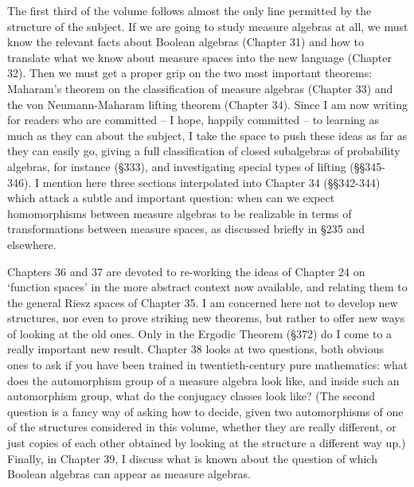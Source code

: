 The first third of the volume follows almost the only line permitted by
the structure of the subject.   If we are going to study measure
algebras at all, we must know the relevant facts about Boolean algebras
(Chapter 31) and how to translate what we know about measure spaces into
the new language (Chapter 32).   Then we must get a proper grip on the
two most important theorems:  Maharam's theorem on the classification of
measure algebras (Chapter 33) and the von Neumann-Maharam lifting
theorem (Chapter 34).   Since I am now writing for readers who are
committed -- I hope, happily committed -- to learning as much as they
can about the subject, I take the space to push these ideas as far as
they can easily go, giving a full classification of closed subalgebras
of probability algebras, for instance (\S333), and investigating special
types of lifting (\S\S345-346).   I mention here three sections
interpolated into Chapter 34 (\S\S342-344) which attack a subtle and
important question:  when can we expect homomorphisms between measure
algebras to be realizable in terms of transformations between measure
spaces, as discussed briefly in \S235 and elsewhere.
     
Chapters 36 and 37 are devoted to re-working the ideas of Chapter 24 on
`function spaces' in the more abstract context now available, and
relating them to the general Riesz spaces of Chapter 35.   I am
concerned here not to develop new structures, nor even to prove striking
new theorems, but rather to offer new ways of looking at the old ones.
Only in the Ergodic Theorem (\S372) do I come to a really
important new result.   Chapter 38 looks at two questions, both obvious
ones to ask if you have been trained in twentieth-century pure
mathematics:  what does the automorphism group of a measure algebra look
like, and inside such an automorphism group, what do the conjugacy
classes look like?   (The second question is a fancy way of asking how
to decide,
given two automorphisms of one of the structures considered in this
volume, whether they are really different, or just copies
of each other obtained by looking at the structure a different way up.)
Finally, in Chapter 39, I discuss what is known about the question of
which Boolean algebras can appear as measure algebras.
     
